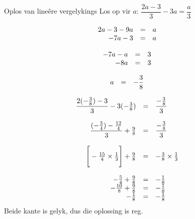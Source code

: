 \begin{wex}
{Oplos van lineêre vergelykings}
{Los op vir $a$: $\dfrac{2a-3}{3}-3a=\dfrac{a}{3}$}
{

\begin{equation*}
    \begin{array}{cccc}\hfill 2a-3 - 9a &= &a\hfill & \\ 
\hfill -7a - 3 &= &a\hfill & 
    \end{array}
\end{equation*}

\begin{equation*}
    \begin{array}{cccc}\hfill -7a -a &= &3\hfill & \\ 
\hfill -8a &= &3\hfill & \\
    \end{array}
\end{equation*}

\begin{equation*}
    \begin{array}{cccc}\hfill a &= & -\dfrac{3}{8}\hfill & \\ 

    \end{array}
\end{equation*}

\begin{equation*}
    \begin{array}{ccll}\hfill \dfrac{2(-\frac{3}{8}) - 3}{3} - 3(-\frac{3}{8}) &= & \dfrac{-\frac{3}{8}}{3}\hfill & \\ 
\\
      \hfill \dfrac{(-\frac{3}{4}) - \frac{12}{4}}{3} + \frac{9}{8} &= & \dfrac{-\frac{3}{8}}{3}\hfill & \\ 
\\
 \hfill \Bigg[-\frac{15}{4} \times \frac{1}{3}\Bigg] + \frac{9}{8} &= & -\frac{3}{8} \times \frac{1}{3}\hfill & \\ 
\\
 \hfill -\frac{5}{4} + \frac{9}{8} &= & -\frac{1}{8}\hfill & \\ 
 \hfill -\frac{10}{8} + \frac{9}{8} &= & -\frac{1}{8}\hfill & \\ 
 \hfill -\frac{1}{8} &= & -\frac{1}{8}\hfill & 
    \end{array}
\end{equation*}
Beide kante is gelyk, dus die oplossing is reg.
}
\end{wex}

